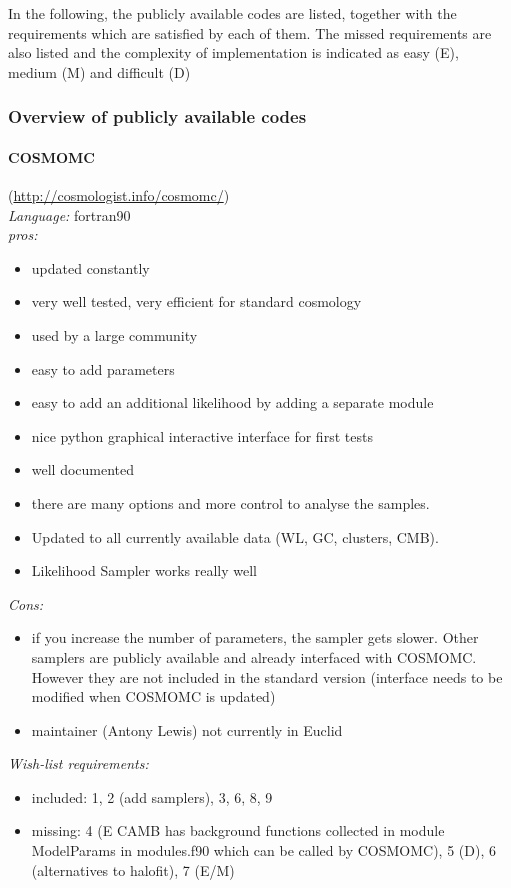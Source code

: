 In the following, the publicly available codes are listed, together with the requirements which are satisfied by each of them. The missed requirements are also listed and the complexity 
of implementation is indicated as easy (E), medium (M) and difficult (D)

\subsubsection{Overview of publicly available codes}

\paragraph{COSMOMC}(\url{http://cosmologist.info/cosmomc/})\\
{\it Language:} fortran90\\
{\it pros:}
\begin{itemize}
 \item updated constantly
 \item very well tested, very efficient for standard cosmology
 \item used by a large community
 \item easy to add parameters
 \item easy to add an additional likelihood by adding a separate module
 \item nice python graphical interactive interface for first tests
 \item well documented
 \item there are many options and more control to analyse the samples. 
 \item Updated to all currently available data (WL, GC, clusters, CMB).
 \item Likelihood Sampler works really well
\end{itemize}
{\it Cons: }
\begin{itemize}
 \item if you increase the number of parameters, the sampler gets slower. Other samplers are publicly available and already interfaced with COSMOMC. However they are not included in the 
 standard version (interface needs to be modified when COSMOMC is updated)
 \item maintainer (Antony Lewis) not currently in Euclid
\end{itemize}
{\it Wish-list requirements: }
\begin{itemize}
 \item included: 1, 2 (add samplers), 3, 6, 8, 9
 \item missing: 4 (E CAMB has background functions collected in module ModelParams in modules.f90 which can be called by COSMOMC), 5 (D), 6 (alternatives to halofit), 7 (E/M) 
\end{itemize}

